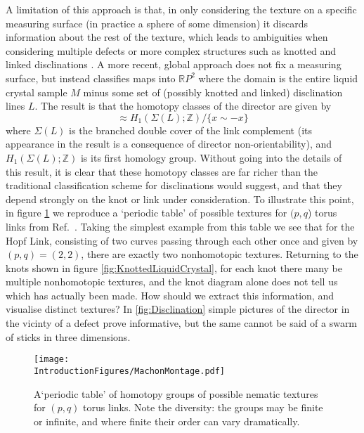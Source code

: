 A limitation of this approach is that, in only considering the texture on a specific measuring surface (in practice a sphere of some dimension) it discards information about the rest of the texture, which leads to ambiguities when considering multiple defects or more complex structures such as knotted and linked disclinations \citep{Alexander2012,MachonThesis,Machon2014,Machon2016}. A more recent, global approach \citep{MachonThesis,Machon2014,Machon2016} does not fix a measuring surface, but instead classifies maps into $\mathbb{R}P^2$ where the domain is the entire liquid crystal sample $M$ minus some set of (possibly knotted and linked) disclination lines $L$. The result is that the homotopy classes of the director are given by
\begin{equation}
[M-L, \mathbb{R}P^2] \approx H_1(\Sigma(L); \mathbb{Z})/\{ x \sim -x\}
\label{eq:HomotopyClassification}
\end{equation}
where $\Sigma(L)$ is the branched double cover of the link complement (its appearance in the result is a consequence of director non-orientability), and $H_1(\Sigma(L); \mathbb{Z})$ is its first homology group. Without going into the details of this result, it is clear that these homotopy classes are far richer than the traditional classification scheme for disclinations would suggest, and that they depend strongly on the knot or link under consideration. To illustrate this point, in figure \ref{fig:MachonMontage} we reproduce a `periodic table' of possible textures for $(p,q$) torus links from Ref.~\citep{MachonThesis}. Taking the simplest example from this table we see that for the Hopf Link, consisting of two curves passing through each other once and given by $(p,q)=(2,2)$, there are exactly two nonhomotopic textures. Returning to the knots shown in figure \ref{fig:KnottedLiquidCrystal}, for each knot there many be multiple nonhomotopic textures, and the knot diagram alone does not tell us which has actually been made. How should we extract this information, and visualise distinct textures? In \ref{fig:Disclination} simple pictures of the director in the vicinty of a defect prove informative, but the same cannot be said of a swarm of sticks in three dimensions.
\begin{figure}[htbp]
\centering
\texttt{[image: \\IntroductionFigures/MachonMontage.pdf]}
\caption{A`periodic table' of homotopy groups of possible nematic textures for $(p,q)$ torus links. Note the diversity: the groups may be finite or infinite, and where finite their order can vary dramatically.}
\label{fig:MachonMontage}
\end{figure}

